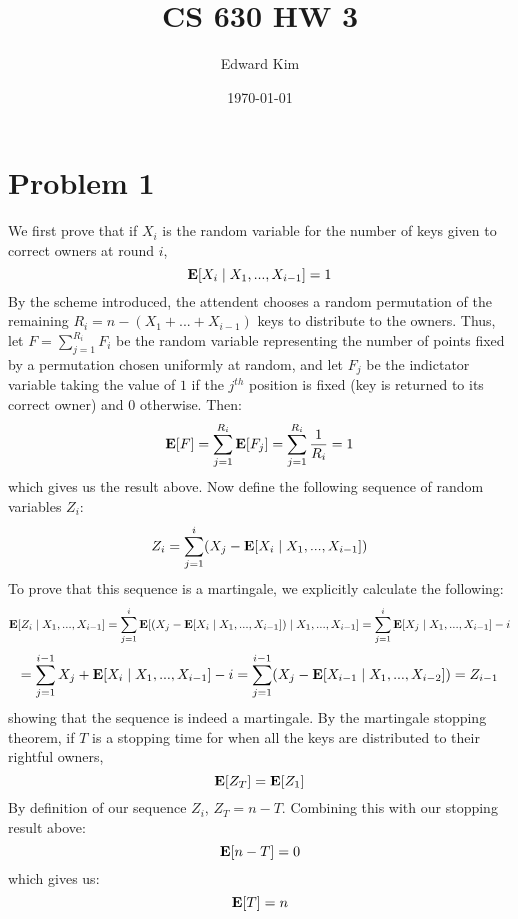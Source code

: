 \documentclass[12pt]{article}%
\begin{document}
\title{CS 630 HW 3}
\author{Edward Kim}
\date{\today}
\maketitle

\section*{Problem 1}
We first prove that if $X_i$ is the random variable for the number of keys given to correct owners at round $i$,
$$ {\bf E}[X_i \mid X_1,...,X_{i-1}] = 1$$
By the scheme introduced, the attendent chooses a random permutation of the remaining $R_i = n - (X_1 + ... + X_{i-1})$ keys to distribute to the owners. Thus, let $F = \sum_{j=1}^{R_i} F_i$ be the random variable representing the number of points fixed by a permutation chosen uniformly at random, and let $F_j$ be the indictator variable taking the value of $1$ if the $j^{th}$ position is fixed (key is returned to its correct owner) and $0$ otherwise. Then:
$$ {\bf E}[F] = \sum_{j=1}^{R_i} {\bf E}[F_j] = \sum_{j=1}^{R_i} \frac{1}{R_i} = 1 $$
which gives us the result above. \newline \newline
Now define the following sequence of random variables $Z_i$:
$$ Z_i = \sum_{j=1}^i (X_j - {\bf E}[X_i \mid X_1,...,X_{i-1}])$$ To prove that this sequence is a martingale, we explicitly calculate the following:
$$ {\bf E}[Z_i \mid X_1,...,X_{i-1}] = \sum_{j=1}^i {\bf E}[(X_j - {\bf E}[X_i \mid X_1,...,X_{i-1}])\mid X_1,...,X_{i-1}] = \sum_{j=1}^i {\bf E}[X_j \mid X_1,...,X_{i-1}] - i$$
$$= \sum_{j=1}^{i-1} X_{j} + {\bf E}[X_i \mid X_1,...,X_{i-1}] - i = \sum_{j=1}^{i-1} (X_j - {\bf E}[X_{i-1} \mid X_1,...,X_{i-2}]) = Z_{i-1}$$
showing that the sequence is indeed a martingale.\newline \newline
By the martingale stopping theorem, if $T$ is a stopping time for when all the keys are distributed to their rightful owners,
$$ {\bf E}[Z_T] = {\bf E}[Z_1]$$ By definition of our sequence $Z_i$, $Z_T = n - T$. Combining this with our stopping result above:
$$ {\bf E}[n - T] = 0$$ which gives us:
$${\bf E}[T] = n $$
\end{document}
